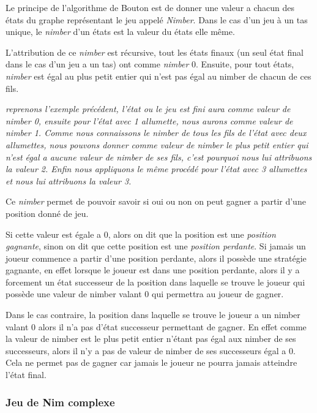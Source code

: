     Le principe de l'algorithme de Bouton est de donner une valeur a chacun des états du graphe représentant le jeu appelé \textit{Nimber}. Dans le cas d'un jeu \`a un tas unique, le \textit{nimber} d'un états est la valeur du états elle même.

    L'attribution de ce \textit{nimber} est récursive, tout les états finaux (un seul état final dans le cas d'un jeu a un tas) ont comme \textit{nimber} 0. Ensuite, pour tout états, \textit{nimber} est égal au plus petit entier qui n'est pas égal au nimber de chacun de ces fils.

    \textit {
    reprenons l'exemple précédent, l’état ou le jeu est fini aura comme valeur de nimber 0, ensuite pour l’état avec 1 allumette, nous aurons comme valeur de nimber 1. Comme nous connaissons le nimber de tous les fils de l’état avec deux allumettes, nous pouvons donner comme valeur de nimber le plus petit entier qui n'est égal a aucune valeur de nimber de ses fils, c'est pourquoi nous lui attribuons la valeur 2. Enfin nous appliquons le même procédé pour l’état avec 3 allumettes et nous lui attribuons la valeur 3.
    }

    Ce \textit{nimber} permet de pouvoir savoir si oui ou non on peut gagner a partir d'une position donné de jeu.

    Si cette valeur est égale a 0, alors on dit que la position est une \textit{position gagnante}, sinon on dit que cette position est une \textit{position perdante}. Si jamais un joueur commence a partir d'une position perdante, alors il possède une stratégie gagnante, en effet lorsque le joueur est dans une position perdante, alors il y a forcement un état successeur de la position dans laquelle se trouve le joueur qui possède une valeur de nimber valant 0 qui permettra au joueur de gagner.

    Dans le cas contraire, la position dans laquelle se trouve le joueur a un nimber valant 0 alors il n'a pas d’état successeur permettant de gagner. En effet comme la valeur de nimber est le plus petit entier n’étant pas égal aux nimber de ses successeurs, alors il n'y a pas de valeur de nimber de ses successeurs égal a 0. Cela ne permet pas de gagner car jamais le joueur ne pourra jamais atteindre l’état final.

  \subsubsection{Jeu de Nim complexe}
  \label{subsub:Jeu de Nim complexe}

